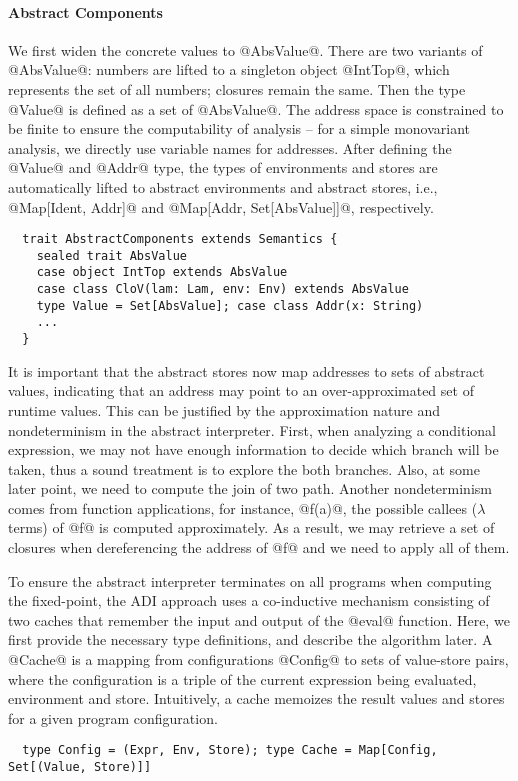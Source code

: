 \paragraph{Abstract Components}

We first widen the concrete values to @AbsValue@. There are two variants of
@AbsValue@: numbers are lifted to a singleton object @IntTop@, which represents
the set of all numbers; closures remain the same. Then the type @Value@ is
defined as a set of @AbsValue@.  The address space is constrained to be finite
to ensure the computability of analysis -- for a simple monovariant analysis,
we directly use variable names for addresses. After defining the @Value@ and
@Addr@ type, the types of environments and stores are automatically lifted to
abstract environments and abstract stores, i.e., @Map[Ident, Addr]@ and
@Map[Addr, Set[AbsValue]]@, respectively.  
\begin{lstlisting}
  trait AbstractComponents extends Semantics {
    sealed trait AbsValue
    case object IntTop extends AbsValue
    case class CloV(lam: Lam, env: Env) extends AbsValue
    type Value = Set[AbsValue]; case class Addr(x: String)
    ...
  }
\end{lstlisting}

It is important that the abstract stores now map addresses to sets of abstract
values, indicating that an address may point to an over-approximated set of
runtime values.  This can be justified by the approximation nature
and nondeterminism in the abstract interpreter.  First, when
analyzing a conditional expression, we may not have enough information to
decide which branch will be taken, thus a sound treatment is to explore the both
branches. Also, at some later point, we need to compute the join of two path.
Another nondeterminism comes from function applications, for instance, @f(a)@,
the possible callees ($\lambda$ terms) of @f@ is computed approximately.  As a
result, we may retrieve a set of closures when dereferencing the address of @f@
and we need to apply all of them.

To ensure the abstract interpreter terminates on all programs when computing
the fixed-point, the ADI approach uses a co-inductive mechanism consisting of
two caches that remember the input and output of the @eval@ function.
Here, we first provide the necessary type definitions, and describe
the algorithm later. A @Cache@ is a mapping from configurations @Config@ to
sets of value-store pairs, where the configuration is a triple of the current
expression being evaluated, environment and store. Intuitively, a cache memoizes
the result values and stores for a given program configuration.
\begin{lstlisting}
  type Config = (Expr, Env, Store); type Cache = Map[Config, Set[(Value, Store)]]
\end{lstlisting}

